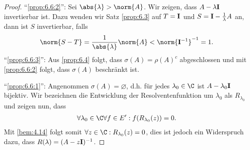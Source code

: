 \begin{proof}
``\ref{prop:6.6:2}'': Sei $\abs{\lambda}> \norm{A}$. Wir 
zeigen, dass $A-\lambda\mathbf{I}$ invertierbar ist. Dazu wenden wir Satz
\ref{prop:6.3} auf $T=\mathbf{I}$ und $S=\mathbf{I}-\frac{1}{\lambda}A$ an, dann ist $S$
invertierbar, falls
\begin{align*}
\norm{S-T} = \frac{1}{\abs{\lambda}}\norm{A} < \norm{\Id^{-1}}^{-1}
= 1.
\end{align*}
``\ref{prop:6.6:3}'': Aus \ref{prop:6.4} folgt, dass $\sigma(A) = \rho(A)^c$
abgeschlossen und mit \ref{prop:6.6:2} folgt, dass $\sigma(A)$ beschränkt ist.

``\ref{prop:6.6:1}'': Angenommen $\sigma(A)=\varnothing$, d.h. für jedes
$\lambda_0\in\C$ ist $A-\lambda_0\mathbf{I}$ bijektiv. Wir bezeichnen die
Entwicklung der Resolventenfunktion um $\lambda_0$ als $R_{\lambda_0}$ und
zeigen nun, dass
\begin{align*}
\forall \lambda_0 \in \C \forall f\in E' : f(R_{\lambda_0}(z)) = 0.
\end{align*} 
Mit \ref{bem:4.14} folgt somit $\forall z\in\C :
R_{\lambda_0}(z)=0$, dies ist jedoch ein Widerspruch dazu, dass
$R(\lambda)=(A-z\mathbf{I})^{-1}$.


\end{proof}
